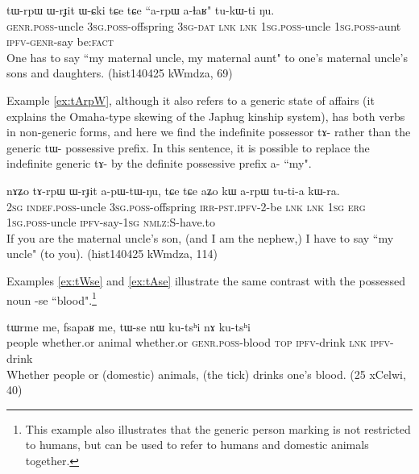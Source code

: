 \documentclass[oldfontcommands,oneside,a4paper,11pt]{article}
\newcommand{\ipa}[1]{{\phon \mbox{#1}}} %
\begin{document}
\begin{exe}
\ex \label{ex:tWrpW}
\gll
 \ipa{tɯ-rpɯ} 	\ipa{ɯ-rɟit} 	\ipa{ɯ-ɕki} 	\ipa{tɕe} 	\ipa{tɕe} 	``\ipa{a-rpɯ} \ipa{a-ɬaʁ}" 	\ipa{tu-kɯ-ti} 	\ipa{ŋu.} \\
\textsc{genr.poss}-uncle \textsc{3sg.poss}-offspring \textsc{3sg-dat} \textsc{lnk} \textsc{lnk} \textsc{1sg.poss}-uncle \textsc{1sg.poss}-aunt \textsc{ipfv-genr}-say be:\textsc{fact} \\
\glt One has to say ``my maternal uncle, my maternal aunt" to one's maternal uncle's sons and daughters. (hist140425 kWmdza, 69)
\end{exe}

Example \ref{ex:tArpW}, although it also refers to a generic state of affairs (it explains the Omaha-type skewing of the Japhug kinship system), has both verbs in non-generic forms, and here we find the indefinite possessor \ipa{tɤ-} rather than the generic \ipa{tɯ-} possessive prefix. In this sentence, it is possible to replace the indefinite generic \ipa{tɤ-} by the definite possessive prefix \ipa{a-} ``my".

\begin{exe}
\ex  \label{ex:tArpW}
\gll
\ipa{nɤʑo} 	\ipa{tɤ-rpɯ} 	\ipa{ɯ-rɟit} 	\ipa{a-pɯ-tɯ-ŋu,} 	\ipa{tɕe} 	\ipa{tɕe} 	\ipa{aʑo} 	\ipa{kɯ} 	\ipa{a-rpɯ} 	\ipa{tu-ti-a} 	\ipa{kɯ-ra.}  \\
\textsc{2sg} \textsc{indef.poss}-uncle \textsc{3sg.poss}-offspring \textsc{irr-pst.ipfv}-2-be \textsc{lnk} \textsc{lnk} \textsc{1sg} \textsc{erg}  \textsc{1sg.poss}-uncle \textsc{ipfv}-say-\textsc{1sg} \textsc{nmlz:S}-have.to  \\
\glt If you are the maternal uncle's son, (and I am the nephew,) I have to say ``my uncle" (to you).  (hist140425 kWmdza, 114)
\end{exe}

Examples \ref{ex:tWse} and \ref{ex:tAse} illustrate the same contrast with the possessed noun \ipa{-se} ``blood".\footnote{This example also illustrates that the generic person marking is not restricted to humans, but can be used to refer to humans and domestic animals together.  }

\begin{exe}
\ex  \label{ex:tWse}
\gll
\ipa{tɯrme} 	\ipa{me,} 	\ipa{fsapaʁ} 	\ipa{me,} 	\ipa{tɯ-se} 	\ipa{nɯ} 	\ipa{ku-tsʰi} 	\ipa{nɤ} 	\ipa{ku-tsʰi} \\
people whether.or animal whether.or \textsc{genr.poss}-blood \textsc{top} \textsc{ipfv}-drink \textsc{lnk} \textsc{ipfv}-drink \\
\glt Whether people or (domestic) animals, (the tick) drinks one's blood. (25 xCelwi, 40)
\end{exe}
\end{document}
